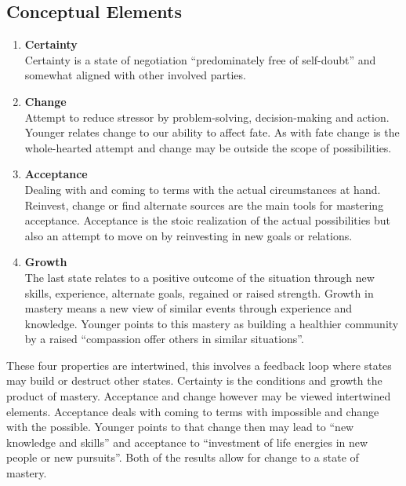 \documentclass[UKenglish]{uiophd}
\begin{document}
		\subsection{Conceptual Elements}
			\begin{enumerate}[label=\bfseries\arabic*]
			\item \textbf{Certainty}\hfill \\
			Certainty is a state of negotiation ``predominately free of self-doubt'' and somewhat aligned with other involved parties\cite[p.84]{Younger1991Theory}.
			\item \textbf{Change}\hfill \\
			Attempt to reduce stressor by problem-solving, decision-making and action\cite[p.84]{Younger1991Theory}. Younger relates change to our ability to affect fate. As with fate change is the whole-hearted attempt and change may be outside the scope of possibilities.
			\item \textbf{Acceptance}\hfill \\
			Dealing with and coming to terms with the actual circumstances at hand. Reinvest, change or find alternate sources are the main tools for mastering acceptance. Acceptance is the stoic realization of the actual possibilities but also an attempt to move on by reinvesting in new goals or relations. %
			\item \textbf{Growth}\hfill \\
			The last state relates to a positive outcome of the situation through new skills, experience, alternate goals, regained or raised strength. Growth in mastery means a new view of similar events through experience and knowledge. Younger points to this mastery as building a healthier community by a raised ``compassion offer others in similar situations''\cite[p.86]{Younger1991Theory}.
			\end{enumerate}

			These four properties are intertwined, this involves a feedback loop where states may build or destruct other states. Certainty is the conditions and growth the product of mastery. Acceptance and change however may be viewed intertwined elements. Acceptance deals with coming to terms with impossible and change with the possible. Younger points to that change then may lead to ``new knowledge and skills'' and acceptance to ``investment of life energies in new people or new pursuits''\cite[p.87]{Younger1991Theory}. Both of the results allow for change to a state of mastery. 
\end{document}
